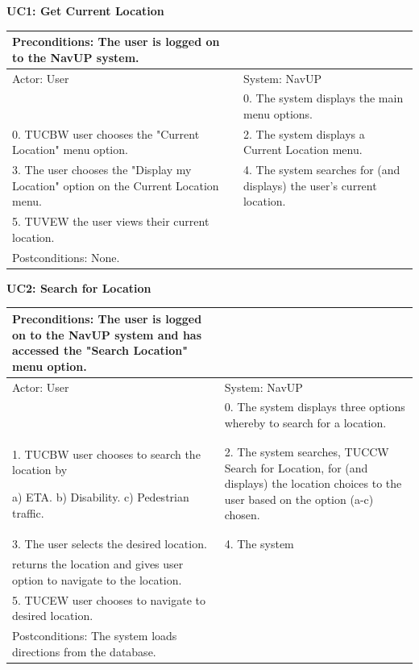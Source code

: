 \documentclass{article}
\begin{document}
			
        		\centering
					\textbf{UC1: Get Current Location}\\
       		 \small
       		 \begin{tabular}{|p{8cm}|p{8cm}|}
       		 \hline
       		 Preconditions: The user is logged on to the NavUP system.& \\
       		 \hline
       		 Actor: User & System: NavUP \\
        		\hline
       		  & 0.	The system displays the main menu options.\\
       		 \hline
       		 0.	TUCBW user chooses the "Current Location" menu option. & 2.	The system displays a Current Location menu.\\
        		\hline
       		3.	The user chooses the "Display my Location" option on the Current Location menu. & 4.	The system searches for (and displays) the user's current location.\\
        		\hline
       		5.	TUVEW the user views their current location. & \\
       		 \hline
        		Postconditions: None.& \\
        		\hline
        \end{tabular} 
     

			
        		\centering
					\textbf{UC2: Search for Location}\\
       		 \small
       		 \begin{tabular}{|p{8cm}|p{8cm}|}
       		 \hline
       		 Preconditions: The user is logged on to the NavUP system and has accessed the "Search Location" menu option.& \\
       		 \hline
       		 Actor: User & System: NavUP \\
        		\hline
       		 & 0.	The system displays three options whereby to search for a location.\\
       		 \hline
       		 1.	TUCBW user chooses to search the location by 

						a)	ETA.
						b)	Disability.
						c)	Pedestrian traffic.
 				& 2.	The system searches, TUCCW Search for Location, for (and displays) the location choices to the user based on the option (a-c) chosen.\\
        		\hline
       		 3.	The user selects the desired location. & 4.	The system\\ returns the location and gives user option to navigate to the location.\\
        		\hline
       		 5.	TUCEW user chooses to navigate to desired location. & \\
       		 \hline
        		Postconditions: The system loads directions from the database.& \\
        		\hline
        \end{tabular} 
\end{document}
